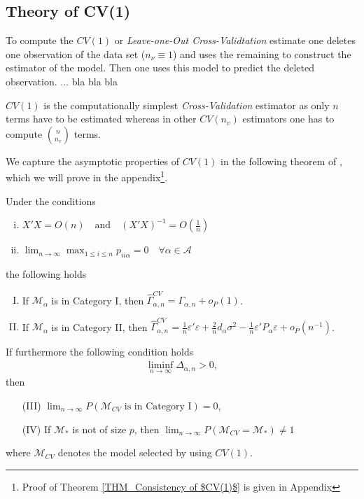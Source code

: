 \documentclass[Research_Module_ES.tex]{subfiles}
\begin{document}
\subsection{Theory of CV(1)}
To compute the $CV(1)$ or \textit{Leave-one-Out Cross-Validtation} estimate one deletes one observation of the data set ($n_\nu\equiv1$) and uses the remaining to construct the estimator of the model. Then one uses this model to predict the
deleted observation. ... bla bla bla\

$CV(1)$ is the computationally simplest \textit{Cross-Validation} estimator as only $n$ terms have to be estimated whereas in other $CV(n_v)$ estimators one has to compute $\binom{n}{n_v}$ terms.\

We capture the asymptotic properties of $CV(1)$ in the following theorem of \cite{shao}, which we will prove in the appendix\footnote{Proof of Theorem \ref{THM_Consistency of $CV(1)$} is given in Appendix }.

\begin{thm}[Consistency of $CV(1)$]
Under the conditions 
\label{THM_Consistency of $CV(1)$}
\begin{enumerate}[(i)]
\item $X'X = O(n) \quad \textrm{and} \quad (X'X)^{-1}=O(\frac{1}{n})$
\item $ \lim_{n \to \infty} \max_{1\le i\le n} p_{ii\alpha} =0 \quad \forall \alpha \in \mathcal{A} $ 
\end{enumerate}
the following holds
\begin{enumerate}[(I)]
\item If $\mathcal{M}_\alpha$ is in Category I, then $\hat{\Gamma}_{\alpha,n}^{CV} = \Gamma_{\alpha,n} + o_P(1)$.
\item If $\mathcal{M}_\alpha$ is in Category II, then $\hat{\Gamma}_{\alpha,n}^{CV} = \frac{1}{n}\varepsilon'\varepsilon + \frac{2}{n}d_\alpha\sigma^2 - \frac{1}{n}\varepsilon'P_\alpha\varepsilon + o_P(n^{-1})$.
\end{enumerate}
If furthermore the following condition holds
\begin{align*}
\liminf_{n\to \infty} \Delta_{\alpha,n} > 0,
\end{align*}
then 
\begin{enumerate}
\item[(III)] $\lim_{n\to\infty} P(\mathcal{M}_{CV}\textrm{ is in Category I})=0$,
\item[(IV)]If $\mathcal{M}_\ast$ is not of size $p$, then $\lim_{n\to\infty}P(\mathcal{M}_{CV}=\mathcal{M}_\ast) \neq 1$
\end{enumerate}
where $\mathcal{M}_{CV}$ denotes the model selected by using $CV(1)$.
\end{thm}
\end{document}
